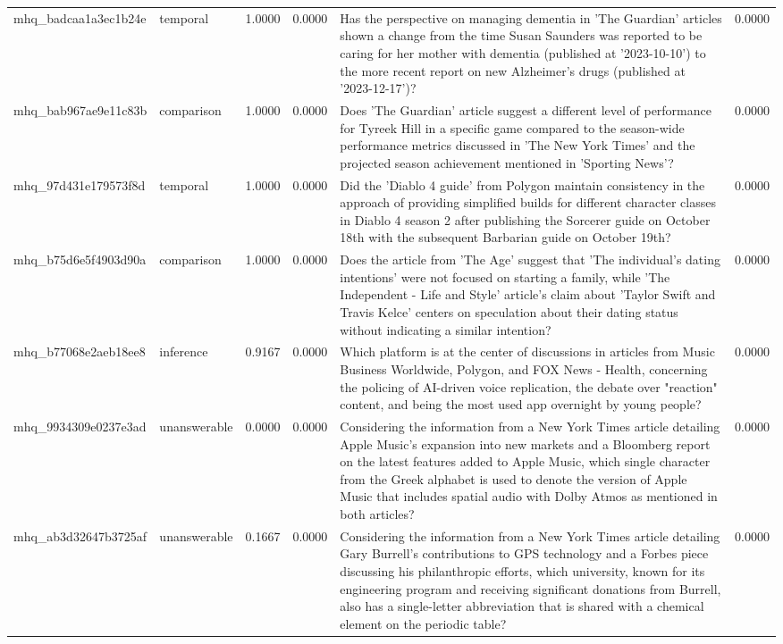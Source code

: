 \begin{tabular}{llrrlr}
mhq_badcaa1a3ec1b24e & temporal & 1.0000 & 0.0000 & Has the perspective on managing dementia in 'The Guardian' articles shown a change from the time Susan Saunders was reported to be caring for her mother with dementia (published at '2023-10-10') to the more recent report on new Alzheimer’s drugs (published at '2023-12-17')? & 0.0000 \\
mhq_bab967ae9e11c83b & comparison & 1.0000 & 0.0000 & Does 'The Guardian' article suggest a different level of performance for Tyreek Hill in a specific game compared to the season-wide performance metrics discussed in 'The New York Times' and the projected season achievement mentioned in 'Sporting News'? & 0.0000 \\
mhq_97d431e179573f8d & temporal & 1.0000 & 0.0000 & Did the 'Diablo 4 guide' from Polygon maintain consistency in the approach of providing simplified builds for different character classes in Diablo 4 season 2 after publishing the Sorcerer guide on October 18th with the subsequent Barbarian guide on October 19th? & 0.0000 \\
mhq_b75d6e5f4903d90a & comparison & 1.0000 & 0.0000 & Does the article from 'The Age' suggest that 'The individual's dating intentions' were not focused on starting a family, while 'The Independent - Life and Style' article's claim about 'Taylor Swift and Travis Kelce' centers on speculation about their dating status without indicating a similar intention? & 0.0000 \\
mhq_b77068e2aeb18ee8 & inference & 0.9167 & 0.0000 & Which platform is at the center of discussions in articles from Music Business Worldwide, Polygon, and FOX News - Health, concerning the policing of AI-driven voice replication, the debate over "reaction" content, and being the most used app overnight by young people? & 0.0000 \\
mhq_9934309e0237e3ad & unanswerable & 0.0000 & 0.0000 & Considering the information from a New York Times article detailing Apple Music's expansion into new markets and a Bloomberg report on the latest features added to Apple Music, which single character from the Greek alphabet is used to denote the version of Apple Music that includes spatial audio with Dolby Atmos as mentioned in both articles? & 0.0000 \\
mhq_ab3d32647b3725af & unanswerable & 0.1667 & 0.0000 & Considering the information from a New York Times article detailing Gary Burrell's contributions to GPS technology and a Forbes piece discussing his philanthropic efforts, which university, known for its engineering program and receiving significant donations from Burrell, also has a single-letter abbreviation that is shared with a chemical element on the periodic table? & 0.0000 \\

\end{tabular}
